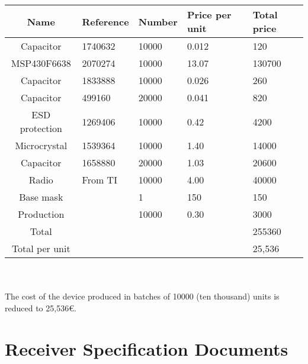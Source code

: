 \begin{tabular}{| c |l | l | l | l |} 
		\hline
		Name & Reference & Number & Price per unit & Total price\\ \hline
	 	Capacitor & 1740632 & 10000 & 0.012  & 120\\ \hline
	 	MSP430F6638 & 2070274 & 10000 & 13.07 & 130700\\ \hline
	 	Capacitor & 1833888 & 10000 & 0.026  & 260\\ \hline
	 	Capacitor & 499160 & 20000 & 0.041  & 820\\ \hline
	 	ESD protection & 1269406 & 10000 & 0.42  & 4200\\ \hline
	 	Microcrystal & 1539364 & 10000 & 1.40 & 14000\\ \hline
	 	Capacitor & 1658880 & 20000 & 1.03  & 20600\\ \hline
	 	Radio & From TI & 10000 & 4.00 & 40000\\ \hline
		Base mask &  & 1 & 150 & 150\\ \hline
		Production &  & 10000 & 0.30 & 3000\\ \hline
	 	Total &  &  &  & 255360\\ \hline
	 	Total per unit &  &  &  & 25,536\\	\hline
\end{tabular}\\\\

	The cost of the device produced in batches of 10000 (ten thousand) units is reduced to  25,536{\small \euro}.


\chapter{Receiver Specification Documents}
\label{ch:specs}

